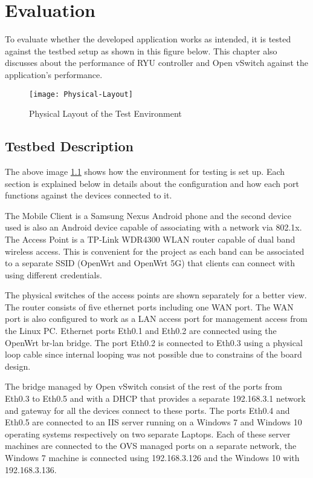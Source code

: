 \chapter{Evaluation}\label{ch:Evaluation}
To evaluate whether the developed application works as intended, it is tested against the testbed setup as shown in this figure below. This chapter also discusses about the performance of RYU controller and Open vSwitch against the application’s performance.

  \begin{figure}[H]
	\centering
	\texttt{[image: Physical-Layout]}
	\caption {Physical Layout of the Test Environment}
	\label{fig:test-layout}
	\vspace{-10pt}
  \end{figure}

\section{Testbed Description}
The above image \ref{fig:test-layout} shows how the environment for testing is set up. Each section is explained below in details about the configuration and how each port functions against the devices connected to it.

The Mobile Client is a Samsung Nexus Android phone and the second device used is also an Android device capable of associating with a network via 802.1x. The Access Point is a TP-Link WDR4300 WLAN router capable of dual band wireless access. This is convenient for the project as each band can be associated to a separate SSID (OpenWrt and OpenWrt 5G) that clients can connect with using different credentials.

The physical switches of the access points are shown separately for a better view. The router consists of five ethernet ports including one WAN port. The WAN port is also configured to work as a LAN access port for management access from the Linux PC. Ethernet ports Eth0.1 and Eth0.2 are connected using the OpenWrt br-lan bridge. The port Eth0.2 is connected to Eth0.3 using a physical loop cable since internal looping was not possible due to constrains of the board design.

The bridge managed by Open vSwitch consist of the rest of the ports from Eth0.3 to Eth0.5 and with a DHCP that provides a separate 192.168.3.1 network and gateway for all the devices connect to these ports. The ports Eth0.4 and Eth0.5 are connected to an IIS server running on a Windows 7 and Windows 10 operating systems respectively on two separate Laptops. Each of these server machines are connected to the OVS managed ports on a separate network, the Windows 7 machine is connected using 192.168.3.126 and the Windows 10 with 192.168.3.136.

